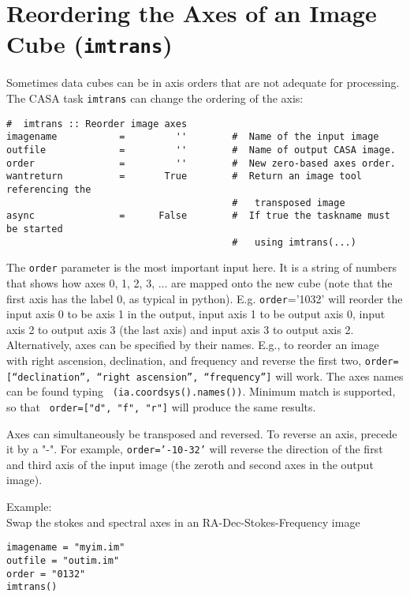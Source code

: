 \section{Reordering the Axes of an Image Cube ({\tt imtrans})}
\label{section:analysis.imtrans}

Sometimes data cubes can be in axis orders that are not adequate for
processing. The CASA task {\tt imtrans} can change the ordering of the axis:
\small
\begin{verbatim}
#  imtrans :: Reorder image axes
imagename           =         ''        #  Name of the input image
outfile             =         ''        #  Name of output CASA image.
order               =         ''        #  New zero-based axes order.
wantreturn          =       True        #  Return an image tool referencing the
                                        #   transposed image
async               =      False        #  If true the taskname must be started
                                        #   using imtrans(...)
\end{verbatim}
\normalsize


The {\tt order} parameter is the most important input here. It is a
string of numbers that shows how axes 0, 1, 2, 3, ... are mapped onto
the new cube (note that the first axis has the label 0, as typical in
python). E.g. {\tt order}='1032' will reorder the input axis 0 to be
axis 1 in the output, input axis 1 to be output axis 0, input axis 2
to output axis 3 (the last axis) and input axis 3 to output axis
2. Alternatively, axes can be specified by their names. E.g., to reorder
an image with right ascension, declination, and frequency and reverse
the first two, {\tt order=[``declination'', ``right ascension'',
  ``frequency'']} will work. The axes names can be found typing {\tt
  (ia.coordsys().names())}. Minimum match is supported, so that  {\tt
  order=["d", "f", "r"]} will produce the same results.

Axes can simultaneously be transposed and reversed. To reverse an
axis, precede it by a "-". For example, {\tt order='-10-32'} will
reverse the direction of the first and third axis of the input image
(the zeroth and second axes in the output image).

Example:\\

Swap the stokes and spectral axes in an RA-Dec-Stokes-Frequency image
\small
\begin{verbatim}
imagename = "myim.im"
outfile = "outim.im"
order = "0132"
imtrans()
\end{verbatim}


